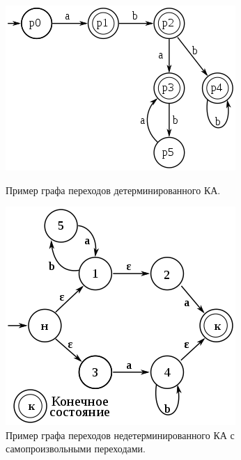 \documentclass{article}
\begin{document}
\begin{figure}[H]
	\centering
	\begin{minipage}[b]{0.4\textwidth}
		\includegraphics[width=\textwidth]{images/dfa.png}
		\caption{Пример графа переходов детерминированного КА.}
	\end{minipage}
	\hfill
	\begin{minipage}[b]{0.4\textwidth}
		\includegraphics[width=\textwidth]{images/ndfa.png}
		\caption{Пример графа переходов недетерминированного КА с самопроизвольными переходами.}
	\end{minipage}
\end{figure}
\end{document}
